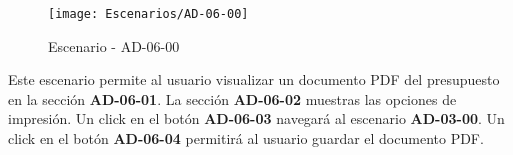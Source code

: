 \begin{figure}[H]
\centering
\texttt{[image: Escenarios/AD-06-00]}
\caption{Escenario - AD-06-00}
\label{fig:AD-06-00}
\end{figure}
Este escenario permite al usuario visualizar un documento PDF del presupuesto en la sección \textbf{AD-06-01}. La sección \textbf{AD-06-02} muestras las opciones de impresión. Un click en el botón \textbf{AD-06-03} navegará al escenario \textbf{AD-03-00}. Un click en el botón \textbf{AD-06-04} permitirá al usuario guardar el documento PDF.
\clearpage
